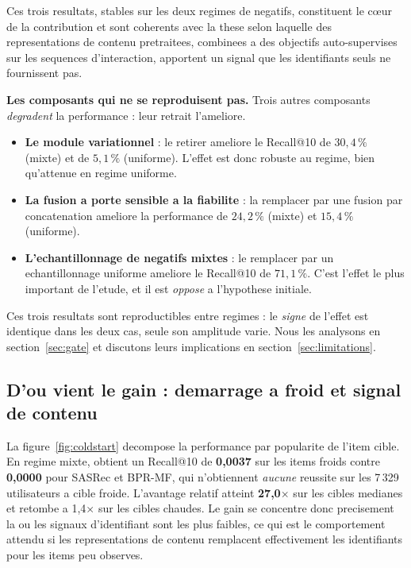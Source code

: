 Ces trois resultats, stables sur les deux regimes de negatifs, constituent le
c\oe{}ur de la contribution et sont coherents avec la these selon laquelle des
representations de contenu pretraitees, combinees a des objectifs
auto-supervises sur les sequences d'interaction, apportent un signal que les
identifiants seuls ne fournissent pas.

\textbf{Les composants qui ne se reproduisent pas.} Trois autres composants
\emph{degradent} la performance : leur retrait l'ameliore.

\begin{itemize}
\item \textbf{Le module variationnel} : le retirer ameliore le Recall@10 de
  $30{,}4\,\%$ (mixte) et de $5{,}1\,\%$ (uniforme). L'effet est donc
  robuste au regime, bien qu'attenue en regime uniforme.
\item \textbf{La fusion a porte sensible a la fiabilite} : la remplacer par une
  fusion par concatenation ameliore la performance de $24{,}2\,\%$ (mixte) et
  $15{,}4\,\%$ (uniforme).
\item \textbf{L'echantillonnage de negatifs mixtes} : le remplacer par un
  echantillonnage uniforme ameliore le Recall@10 de $71{,}1\,\%$. C'est l'effet
  le plus important de l'etude, et il est \emph{oppose} a l'hypothese
  initiale.
\end{itemize}

Ces trois resultats sont reproductibles entre regimes : le \emph{signe} de
l'effet est identique dans les deux cas, seule son amplitude varie. Nous les
analysons en section~\ref{sec:gate} et discutons leurs implications en
section~\ref{sec:limitations}.

\subsection{D'ou vient le gain : demarrage a froid et signal de contenu}
\label{sec:coldstart}

La figure~\ref{fig:coldstart} decompose la performance par popularite de
l'item cible. En regime mixte, \model{} obtient un Recall@10 de \textbf{0,0037}
sur les items froids contre \textbf{0,0000} pour SASRec et BPR-MF, qui
n'obtiennent \emph{aucune} reussite sur les 7\,329 utilisateurs a cible froide.
L'avantage relatif atteint \textbf{27,0$\times$} sur les cibles medianes et
retombe a 1,4$\times$ sur les cibles chaudes. Le gain se concentre donc
precisement la ou les signaux d'identifiant sont les plus faibles, ce qui est
le comportement attendu si les representations de contenu remplacent
effectivement les identifiants pour les items peu observes.

